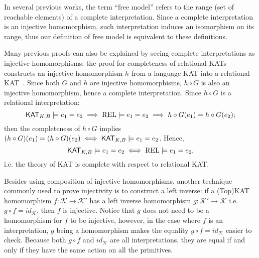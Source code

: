 In several previous works, the term ``free model'' refers to the range (set of
reachable elements) of a complete interpretation.  Since a complete
interpretation is an injective homomorphism, 
such interpretation induces an isomorphism on its range, 
thus our definition of free model is equivalent to these definitions.

Many previous proofs can also be explained by seeing complete interpretations as
injective homomorphisms: the proof for completeness of relational KATs
constructs an injective homomorphism $h$ from a language KAT into a relational
KAT~\cite{Kozen_Smith_1997}.  Since both \(G\) and \(h\) are injective
homomorphisms, \(h  \circ  G\) is also an injective homomorphism, hence a complete
interpretation.  Since \(h  \circ  G\) is a relational interpretation:
\[\mathsf{KAT}_{K, B}  \models  e_1 = e_2  \implies  \mathbf{\mathrm{REL}}  \models  e_1 = e_2  \implies  h  \circ  G(e_1) = h  \circ  G(e_2);\]
then the completeness of \(h  \circ  G\) implies
\((h  \circ  G)(e_1) = (h  \circ  G)(e_2)  \iff  \mathsf{KAT}_{K, B}  \models  e_1 = e_2\). Hence,
\[\mathsf{KAT}_{K, B}  \models  e_1 = e_2  \iff  \mathbf{\mathrm{REL}}  \models  e_1 = e_2,\]
i.e. the theory of KAT is complete with respect to relational KAT.



Besides using composition of injective homomorphisms, another technique commonly
used to prove injectivity is to construct a left inverse: 
if a (Top)KAT homomorphism \(f: \mathcal{K}  \to  \mathcal{K}'\) has a left inverse homomorphism \(g: \mathcal{K}'  \to  \mathcal{K}\) 
i.e. \(g  ∘  f = id_{\mathcal{K}}\), then \(f\) is injective.  
Notice that \(g\) does not need to be a homomorphism for \(f\) to be injective,
however, in the case where \(f\) is an interpretation, 
\(g\) being a homomorphism makes the equality \(g  ∘  f = id_{𝒦}\) easier to check.
Because both \(g  ∘  f\) and \(id_{𝒦}\) are all interpretations,
they are equal if and only if they have the same action on all the primitives.

